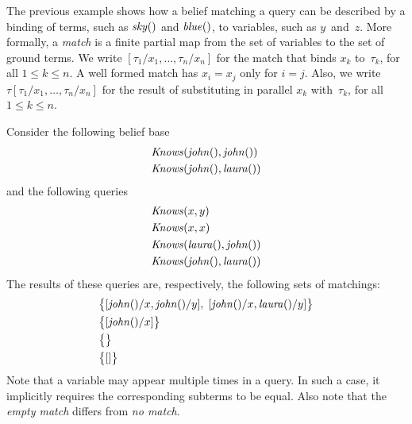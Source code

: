 \documentclass[a4paper,12pt,oneside,fleqn]{book} %
\begin{document}
{The previous example shows how a belief matching a query can be described
by a binding of terms, such as ${\it sky}()$ and ${\it blue}()$, to
variables, such as $y$~and~$z$.  More formally, a \emph{match} is a finite
partial map from the set of variables to the set of ground terms.  We write
$[\tau_1/x_1,\ldots,\tau_n/x_n]$ for the match that binds $x_k$
to~$\tau_k$, for all $1\le k\le n$. A well formed match has $x_i=x_j$ only
for $i=j$.  Also, we write $\tau[\tau_1/x_1,\ldots,\tau_n/x_n]$ for the
result of substituting in parallel $x_k$ with~$\tau_k$, for all $1\le k\le
n$.

\begin{example} Consider the following belief base \begin{align} &{\it
Knows}({\it john}(), {\it john}()) \\ &{\it Knows}({\it john}(), {\it
laura}()) \end{align} and the following queries \begin{align} &{\it
Knows}(x, y) \\ &{\it Knows}(x, x) \\ &{\it Knows}({\it laura}(), {\it
john}()) \\ &{\it Knows}({\it john}(), {\it laura}()) \end{align} The
results of these queries are, respectively, the following sets of
matchings: \begin{align} &\bigl\{ [{\it john}()/x, {\it john}()/y],\; [{\it
john}()/x,{\it laura}()/y] \bigr\} \\ &\bigl\{ [{\it john}()/x] \bigr\} \\
&\bigl\{\bigr\} \\ &\bigl\{[]\bigr\} \end{align} Note that a variable may
appear multiple times in a query.  In such a case, it implicitly requires
the corresponding subterms to be equal.  Also note that the \emph{empty
match} differs from \emph{no match}.
\end{example}

}
\end{document}
